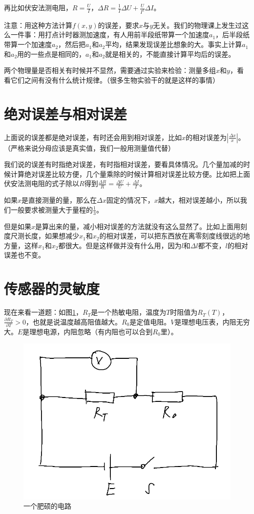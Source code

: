 再比如伏安法测电阻，$R=\frac{U}{I}$，$\Delta R=\frac{1}{I} \Delta U+\frac{U}{I^2} \Delta I$。

注意：用这种方法计算$f(x,y)$的误差，要求$x$与$y$无关。我们的物理课上发生过这么一件事：用打点计时器测加速度，有人用前半段纸带算一个加速度$a_1$，后半段纸带算一个加速度$a_2$，然后把$a_1$和$a_2$平均，结果发现误差比想象的大。事实上计算$a_1$和$a_2$用的一些点是相同的，$a_1$和$a_2$就是相关的，不能直接计算平均后的误差。

两个物理量是否相关有时候并不显然，需要通过实验来检验：测量多组$x$和$y$，看看它们之间有没有什么统计规律。（很多生物实验干的就是这样的事情）
\section{绝对误差与相对误差}
上面说的误差都是绝对误差，有时还会用到相对误差，比如$x$的相对误差为$|\frac{\Delta x}{x}|$。（严格来说分母应该是真实值，我们一般用测量值代替）

我们说的误差有时指绝对误差，有时指相对误差，要看具体情况。几个量加减的时候计算绝对误差比较方便，几个量乘除的时候计算相对误差比较方便。比如把上面伏安法测电阻的式子除以$R$得到$\frac{\Delta R}{R}=\frac{\Delta U}{U}+\frac{\Delta I}{I}$。

如果$x$是直接测量的量，那么在$\Delta x$固定的情况下，$x$越大，相对误差越小，所以我们一般要求被测量大于量程的$\frac{1}{3}$。

但是如果$x$是算出来的量，减小相对误差的方法就没有这么显然了。比如上面用刻度尺测长度，如果想减少$x_1$和$x_2$的相对误差，可以把东西放在离零刻度线很远的地方量，这样$x_1$和$x_2$都很大。但是这样做并没有什么用，因为$l$和$\Delta l$都不变，$l$的相对误差也不变。
\section{传感器的灵敏度}
现在来看一道题：如图\ref{fig-temp-detector}，$R_T$是一个热敏电阻，温度为$T$时阻值为$R_T(T)$，$\frac{\partial R_T}{\partial T}>0$，也就是说温度越高阻值越大。$R_0$是定值电阻。$V$是理想电压表，内阻无穷大。$E$是理想电源，内阻忽略（有内阻也可以合到$R_0$里）。
\begin{figure}[htb]
\centering
\includegraphics[scale=0.5]{fig/temp-detector}
\caption{一个肥硕的电路}
\label{fig-temp-detector}
\end{figure}

